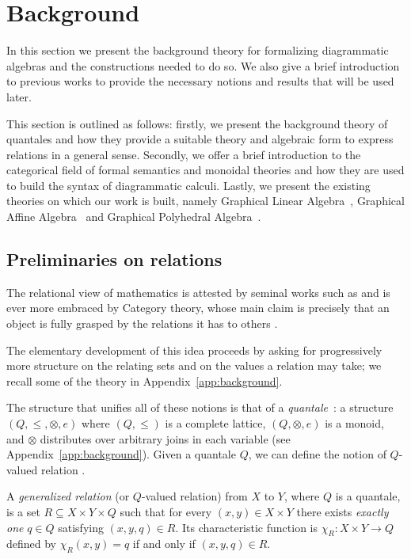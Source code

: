 \section{Background}\label{sec:bg}

In this section we present the background theory for formalizing diagrammatic
algebras and the constructions needed to do so.
We also give a brief introduction to previous works to provide
the necessary notions and results that will be used later.

This section is outlined as follows: firstly, we present the background theory of quantales and
how they provide a suitable theory and algebraic form to express relations in a general sense.
Secondly, we offer a brief introduction to the categorical field of formal semantics and
monoidal theories and how they are used to build the syntax of diagrammatic calculi. Lastly, we
present the existing theories on which our work is built, namely
Graphical Linear Algebra~\cite{paixao2022highlevel,bonchi2017interacting}, Graphical Affine Algebra~\cite{bonchi2019affine} and Graphical Polyhedral Algebra~\cite{bonchi2021polyhedral,bonchi2021.9farkas}.

\subsection{Preliminaries on relations}

The relational view of mathematics is attested by seminal works such as \cite{frege1879begriffsschrift,whitehead1910principia}
and is ever more embraced by Category theory,
whose main claim is precisely that an object is fully grasped
by the relations it has to others \cite{maclane1998categories}.

The elementary development of this idea proceeds by asking for progressively
more structure on the relating sets and on the values a relation may take;
we recall some of the theory in Appendix~\ref{app:background}.

The structure that unifies all of these notions is that of a
\emph{quantale}~\cite{rosenthal1990quantales}: a structure
$(Q,\leq,\otimes,e)$ where $(Q,\leq)$ is a complete lattice, $(Q,\otimes,e)$
is a monoid, and $\otimes$ distributes over arbitrary joins in each variable
(see Appendix~\ref{app:background}).
Given a quantale $Q$, we can define the notion of $Q$-valued relation \cite{coecke2018generalizedrelations}.

\begin{definition}
	A \emph{generalized relation} (or $Q$-valued relation) from $X$ to $Y$, where $Q$ is a quantale, is a set
	$R \subseteq X \times Y \times Q$
	such that for every $(x,y) \in X \times Y$ there exists \emph{exactly one}
	$q \in Q$ satisfying $(x,y,q) \in R$.
	Its characteristic function is $\chi_R: X \times Y \to Q$
	defined by $\chi_R(x,y) = q$ if and only if $(x,y,q) \in R$.
\end{definition}

